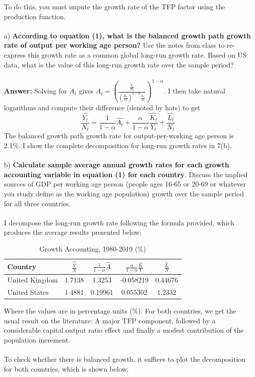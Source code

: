 \documentclass[11pt]{article}
\theoremstyle{mytheoremstyle}
\theoremstyle{mytheoremstyle}
\theoremstyle{myproblemstyle}
\begin{document}
\noindent To do this, you must impute the growth rate of the TFP factor using the production function.
\\ \\ 
a) \textbf{According to equation (1), what is the balanced growth path growth rate of output per working age person?} Use the notes from class to re-express this growth rate as a common global long-run growth rate. Based on US data, what is the value of this long-run growth rate over the sample period?
\\ \\ 
\textbf{Answer:} Solving for $A_t$ gives $A_t=\left(\frac{\frac{Y_t}{N_t}}{\left(\frac{K_t}{Y_t}\right)^{1-\alpha} \frac{L_t}{N_t}}\right)^{1-\alpha}$. I then take natural logarithms and compute their difference (denoted by hats) to get
$$
\frac{\widehat{Y_t}}{N_t}=\frac{1}{1-\alpha} \widehat{A_t}+\frac{\alpha}{1-\alpha} \frac{\widehat{K_t}}{Y_t}+\frac{\widehat{L_t}}{N_t}
$$
The balanced growth path growth rate for output-per-working age person is 2.1\%. I show the complete decomposition for long-run growth rates in 7(b).
\\ \\ 
b) \textbf{Calculate sample average annual growth rates for each growth accounting variable in equation (1) for each country}. Discuss the implied sources of GDP per working age person (people ages 16-65 or 20-69 or whatever you study define as the working age population) growth over the sample period for all three countries.
\\ \\ 
I decompose the long-run growth rate following the formula provided, which produces the average results presented below:

\begin{table}[htbp]
    \centering
    \caption{Growth Accounting, 1980-2019 (\%)}
    \label{tab:growth-accounting}
    \begin{tabular}{lcccc}
    \hline
    Country & $\widehat{\frac{Y}{N}}$ & $\frac{1}{1-\alpha} \widehat{A}$ & $\frac{\alpha}{1-\alpha} \frac{\widehat{K}}{Y}$ & $\frac{\widehat{L}}{N}$ \\ \hline
    United Kingdom & 1.7138 & 1.3253  & -0.058219 & 0.44676 \\
    United States & 1.4881  & 0.19961 & 0.055302 & 1.2332 \\ \hline
    \end{tabular}
    \end{table}

Where the values are in percentage units (\%). For both countries, we get the usual result on the literature: A major TFP component, followed by a considerable capital output ratio effect and finally a modest contribution of the population increment. 
\\ \\ 
To check whether there is balanced growth, it suffices to plot the decomposition for both countries, which is shown below.
\end{document}
